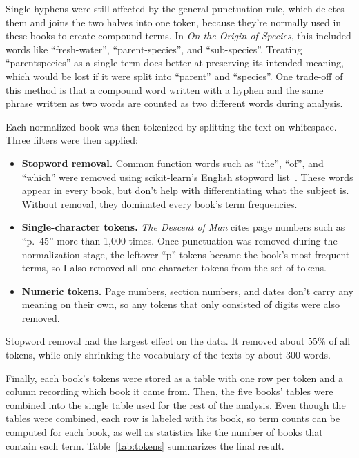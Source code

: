 \documentclass[11pt]{article}
\begin{document}
Single hyphens were still affected by the general punctuation rule, which deletes them and joins the two halves into one token, because they're normally used in these books to create compound terms.
In \emph{On the Origin of Species}, this included words like ``fresh-water'', ``parent-species'', and ``sub-species''.
Treating ``parentspecies'' as a single term does better at preserving its intended meaning, which would be lost if it were split into ``parent'' and ``species''.
One trade-off of this method is that a compound word written with a hyphen and the same phrase written as two words are counted as two different words during analysis.

Each normalized book was then tokenized by splitting the text on whitespace.
Three filters were then applied:
\begin{itemize}
    \item \textbf{Stopword removal.} Common function words such as ``the'', ``of'', and ``which'' were removed using scikit-learn's English stopword list~\cite{sklearn}.
    These words appear in every book, but don't help with differentiating what the subject is.
    Without removal, they dominated every book's term frequencies.
    \item \textbf{Single-character tokens.} \emph{The Descent of Man} cites page numbers such as ``p.~45'' more than 1,000 times.
    Once punctuation was removed during the normalization stage, the leftover ``p'' tokens became the book's most frequent terms, so I also removed all one-character tokens from the set of tokens.
    \item \textbf{Numeric tokens.} Page numbers, section numbers, and dates don't carry any meaning on their own, so any tokens that only consisted of digits were also removed.
\end{itemize}

Stopword removal had the largest effect on the data.
It removed about 55\% of all tokens, while only shrinking the vocabulary of the texts by about 300 words.

Finally, each book's tokens were stored as a table with one row per token and a column recording which book it came from.
Then, the five books' tables were combined into the single table used for the rest of the analysis.
Even though the tables were combined, each row is labeled with its book, so term counts can be computed for each book, as well as statistics like the number of books that contain each term.
Table~\ref{tab:tokens} summarizes the final result.
\end{document}
